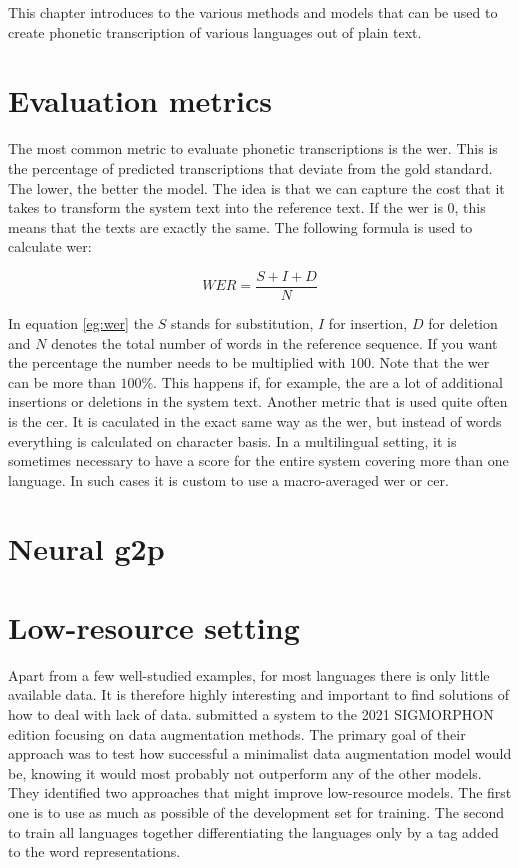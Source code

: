 
\label{chap:3_model}
This chapter introduces to the various methods and models that can be used to create phonetic transcription of various languages out of plain text.


\section{Evaluation metrics}
The most common metric to evaluate phonetic transcriptions is the \ac{wer}. This is the percentage of predicted transcriptions that deviate from the gold standard. The lower, the better the model. The idea is that we can capture the cost that it takes to transform the system text into the reference text. If the \ac{wer} is 0, this means that the texts are exactly the same. The following formula is used to calculate \ac{wer}:    

\begin{equation} 
\label{eq:wer}
WER = \frac{S+I+D}{N}
\end{equation}

In equation \ref{eg:wer} the $S$ stands for substitution, $I$ for insertion, $D$ for deletion and $N$ denotes the total number of words in the reference sequence. If you want the percentage the number needs to be multiplied with $100$. Note that the \ac{wer} can be more than $100$\%. This happens if, for example, the are a lot of additional insertions or deletions in the system text. Another metric that is used quite often is the \ac{cer}. It is caculated in the exact same way as the \ac{wer}, but instead of words everything is calculated on character basis. In a multilingual setting, it is sometimes necessary to have a score for the entire system covering more than one language. In such cases it is custom to use a macro-averaged \ac{wer} or \ac{cer}. 

\section{Neural \ac{g2p}}
 


\section{Low-resource setting}
Apart from a few well-studied examples, for most languages there is only little available data. It is therefore highly interesting and important to find solutions of how to deal with lack of data. \cite{hammond-2021-data} submitted a system to the 2021 SIGMORPHON edition focusing on data augmentation methods. The primary goal of their approach was to test how successful a minimalist data augmentation model would be, knowing it would most probably not outperform any of the other models. They identified two approaches that might improve low-resource models. The first one is to use as much as possible of the development set for training. The second to train all languages together differentiating the languages only by a tag added to the word representations. 





